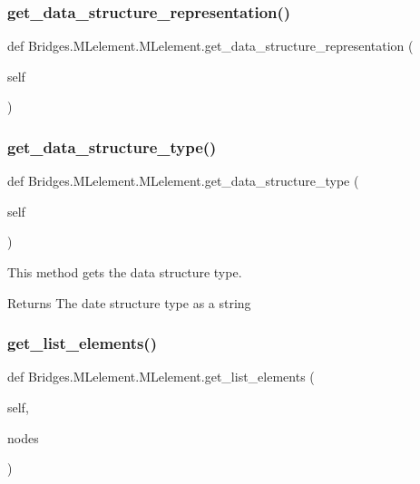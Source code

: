 \subsubsection{\texorpdfstring{get\+\_\+data\+\_\+structure\+\_\+representation()}{get\_data\_structure\_representation()}}
{\footnotesize\ttfamily def Bridges.\+M\+Lelement.\+M\+Lelement.\+get\+\_\+data\+\_\+structure\+\_\+representation (\begin{DoxyParamCaption}\item[{}]{self }\end{DoxyParamCaption})}

\mbox{\label{class_bridges_1_1_m_lelement_1_1_m_lelement_a9b7a6ee7ff5c9e7a57aa5e88983c0a8e}} 
\subsubsection{\texorpdfstring{get\+\_\+data\+\_\+structure\+\_\+type()}{get\_data\_structure\_type()}}
{\footnotesize\ttfamily def Bridges.\+M\+Lelement.\+M\+Lelement.\+get\+\_\+data\+\_\+structure\+\_\+type (\begin{DoxyParamCaption}\item[{}]{self }\end{DoxyParamCaption})}



This method gets the data structure type. 

\begin{DoxyReturn}{Returns}
The date structure type as a string 
\end{DoxyReturn}
\mbox{\label{class_bridges_1_1_m_lelement_1_1_m_lelement_adcb6bb39c380a6a8b2c8b5438dfdd738}} 
\subsubsection{\texorpdfstring{get\+\_\+list\+\_\+elements()}{get\_list\_elements()}}
{\footnotesize\ttfamily def Bridges.\+M\+Lelement.\+M\+Lelement.\+get\+\_\+list\+\_\+elements (\begin{DoxyParamCaption}\item[{}]{self,  }\item[{}]{nodes }\end{DoxyParamCaption})}



